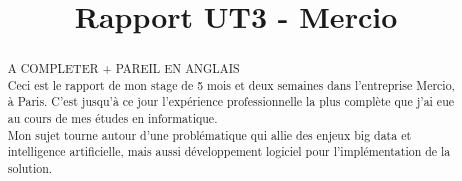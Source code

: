 \documentclass{rapportCS}
\title{Rapport UT3 - Mercio} %
\begin{document}








        
\fairemarges %
\fairepagedegarde %

\begin{center}
	\begin{abstract}
A COMPLETER + PAREIL EN ANGLAIS \\
        
Ceci est le rapport de mon stage de 5 mois et deux semaines  dans l'entreprise Mercio, à Paris.
C'est jusqu'à ce jour l'expérience professionnelle la plus complète que j'ai eue au cours de mes 
études en informatique. \\
Mon sujet tourne autour d'une problématique qui allie des enjeux big data et intelligence 
artificielle, mais aussi développement logiciel pour l'implémentation de la solution.
    \end{abstract}
\end{center}
\newpage


\tabledematieres %
\end{document}
